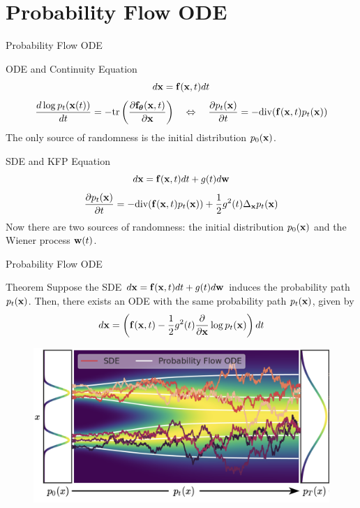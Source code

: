 \documentclass{beamer}
\begin{document}
\section{Probability Flow ODE}
\begin{frame}{Probability Flow ODE}
	\begin{block}{ODE and Continuity Equation}
		\vspace{-0.3cm}
		\[
			d\mathbf{x} = \mathbf{f}(\mathbf{x}, t) dt
		\]
		\[
			\frac{d \log p_t(\mathbf{x}(t))}{d t} = - \text{tr} \left( \frac{\partial \mathbf{f}_{\boldsymbol{\theta}}(\mathbf{x}, t)}{\partial \mathbf{x}} \right) 
			\quad  \Leftrightarrow  \quad 
 			\frac{\partial p_t(\mathbf{x})}{\partial t} = - \text{div}(\mathbf{f}(\mathbf{x}, t) p_t(\mathbf{x}))
 		\]
		The only source of randomness is the initial distribution $p_0(\mathbf{x})$.
	\end{block}
	\begin{block}{SDE and KFP Equation}
		\vspace{-0.3cm}
		\[
			d\mathbf{x} = \mathbf{f}(\mathbf{x}, t) dt + g(t) d \mathbf{w}
		\]
 		\[
 			\frac{\partial p_t(\mathbf{x})}{\partial t} = - \text{div}(\mathbf{f}(\mathbf{x}, t) p_t(\mathbf{x})) + \frac{1}{2}g^2(t) \Delta_{\mathbf{x}}p_t(\mathbf{x})
 		\]
		Now there are two sources of randomness: the initial distribution $p_0(\mathbf{x})$ and the Wiener process $\mathbf{w}(t)$.
	\end{block}
\end{frame}
\begin{frame}{Probability Flow ODE}
	\begin{block}{Theorem}
		Suppose the SDE $d\mathbf{x} = \mathbf{f}(\mathbf{x}, t) dt + g(t) d \mathbf{w}$ induces the probability path $p_t(\mathbf{x})$.
		Then, there exists an ODE with the same probability path $p_t(\mathbf{x})$, given by
		\vspace{-0.3cm}
		\[
			d\mathbf{x} = \left(\mathbf{f}(\mathbf{x}, t) -\frac{1}{2} g^2(t) \frac{\partial}{\partial \mathbf{x}} \log p_t(\mathbf{x}) \right) dt
		\]
		\vspace{-0.7cm}
	\end{block}
	\begin{figure}
		\includegraphics[width=0.75\linewidth]{figs/probability_flow}
	\end{figure}
\end{frame}
\end{document}
